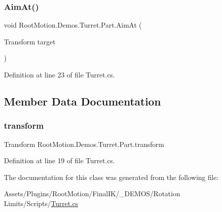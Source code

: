 \subsubsection{\texorpdfstring{Aim\+At()}{AimAt()}}
{\footnotesize\ttfamily void Root\+Motion.\+Demos.\+Turret.\+Part.\+Aim\+At (\begin{DoxyParamCaption}\item[{Transform}]{target }\end{DoxyParamCaption})}



Definition at line 23 of file Turret.\+cs.



\subsection{Member Data Documentation}
\mbox{\label{class_root_motion_1_1_demos_1_1_turret_1_1_part_a0335fa00251dd9a995afa4a42626909b}} 
\subsubsection{\texorpdfstring{transform}{transform}}
{\footnotesize\ttfamily Transform Root\+Motion.\+Demos.\+Turret.\+Part.\+transform}



Definition at line 19 of file Turret.\+cs.



The documentation for this class was generated from the following file\+:\begin{DoxyCompactItemize}
\item 
Assets/\+Plugins/\+Root\+Motion/\+Final\+I\+K/\+\_\+\+D\+E\+M\+O\+S/\+Rotation Limits/\+Scripts/\mbox{\hyperlink{_turret_8cs}{Turret.\+cs}}\end{DoxyCompactItemize}
